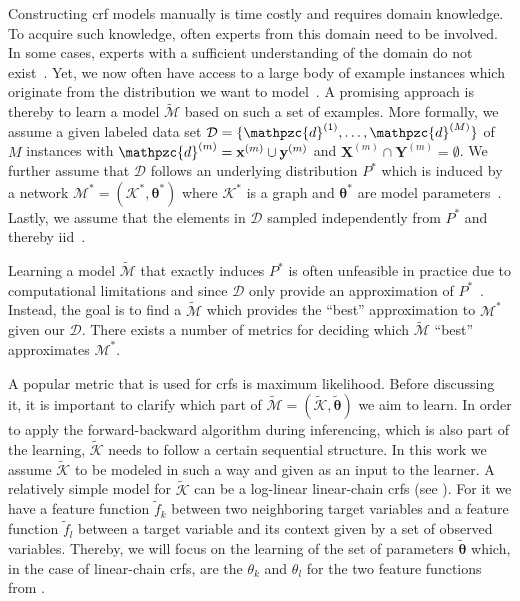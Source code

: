 Constructing \gls{crf} models manually is time costly and requires domain knowledge.
To acquire such knowledge, often experts from this domain need to be involved.
In some cases, experts with a sufficient understanding of the domain do not exist~\citep{koller2009probabilistic}.
Yet, we now often have access to a large body of example instances which originate from the distribution we want to model~\citep{koller2009probabilistic}.
A promising approach is thereby to learn a model $\mathcal{\tilde{M}}$ based on such a set of examples.
More formally, we assume a given labeled data set $\mathcal{D}=\{\mathpzc{d}^{(1)},\dots,\mathpzc{d}^{(M)}\}$ of $M$ instances with $\mathpzc{d}^{(m)}=\mathbf{x}^{(m)}\cup\mathbf{y}^{(m)}$ and $\mathbf{X}^{(m)}\cap\mathbf{Y}^{(m)}=\emptyset$.
We further assume that $\mathcal{D}$ follows an underlying distribution $P^*$ which is induced by a network $\mathcal{M}^*=(\mathcal{K}^*,\mathbf{\theta}^*)$ where $\mathcal{K}^*$ is a graph and $\mathbf{\theta}^*$ are model parameters~\citep{koller2009probabilistic}.
Lastly, we assume that the elements in $\mathcal{D}$ sampled independently from $P^*$ and thereby \acrfull{iid}~\citep{koller2009probabilistic}.

\bigskip

Learning a model $\mathcal{\tilde{M}}$ that exactly induces $P^*$ is often unfeasible in practice due to computational limitations and since $\mathcal{D}$ only provide an approximation of $P^*$~\citep{koller2009probabilistic}.
Instead, the goal is to find a $\mathcal{\tilde{M}}$ which provides the ``best'' approximation to $\mathcal{M}^*$ given our $\mathcal{D}$.
There exists a number of metrics for deciding which $\mathcal{\tilde{M}}$ ``best'' approximates $\mathcal{M}^*$.

A popular metric that is used for \glspl{crf} is \gls{maximum likelihood}.
Before discussing it, it is important to clarify which part of $\mathcal{\tilde{M}}=(\mathcal{\tilde{K}},\mathbf{\tilde{\theta}})$ we aim to learn.
In order to apply the forward-backward algorithm during inferencing, which is also part of the learning, $\mathcal{\tilde{K}}$ needs to follow a certain sequential structure.
In this work we assume $\mathcal{\tilde{K}}$ to be modeled in such a way and given as an input to the learner.
A relatively simple model for $\mathcal{\tilde{K}}$ can be a log-linear \glspl{linear-chain crf} (see ). For it we have a \gls{feature function} $\tilde{f}_k$ between two neighboring \glspl{target variable} and a \gls{feature function} $\tilde{f}_l$ between a \gls{target variable} and its context given by a set of \glspl{observed variable}.
Thereby, we will focus on the learning of the set of parameters $\mathbf{\tilde{\theta}}$ which, in the case of \glspl{linear-chain crf}, are the $\theta_k$ and $\theta_l$ for the two \glspl{feature function} from .

